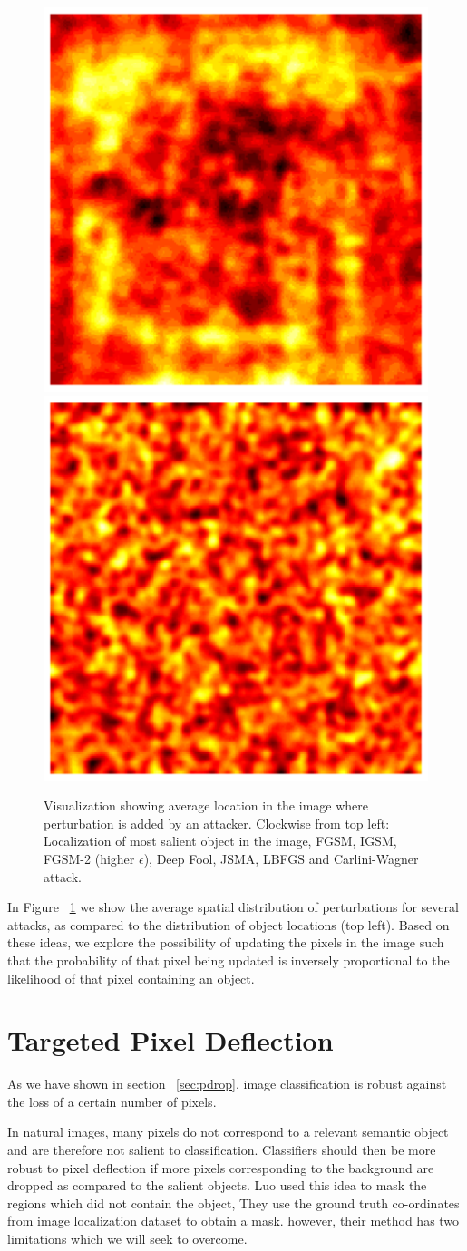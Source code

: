 \begin{figure}[H]
   \includegraphics[width=0.242\linewidth]{figures/pixel/vis_attack_5.pdf}
   \includegraphics[width=0.242\linewidth]{figures/pixel/vis_attack_9.pdf}
   
   \caption[Location of perturbation]{Visualization showing average location in the image where perturbation is added by an attacker.
   Clockwise from top left:
   Localization of most salient object in the image, FGSM, IGSM, FGSM-2 (higher $\epsilon$), Deep Fool, JSMA, LBFGS and Carlini-Wagner attack.
   \label{fig:visattack}}
   
\end{figure}

In Figure ~\ref{fig:visattack} we show the average spatial distribution of perturbations for several attacks, as compared to the distribution of object locations (top left). 
Based on these ideas, we explore the possibility of updating the pixels in the image such that the probability of that pixel being updated is inversely proportional to the likelihood of that pixel containing an object.


\section{Targeted Pixel Deflection \label{sec:tpd}}

As we have shown in section ~\ref{sec:pdrop}, image classification is robust against the loss of a certain number of pixels. 

In natural images, many pixels do not correspond to a relevant semantic object and are therefore not salient to classification.
Classifiers should then be more robust to pixel deflection if more pixels corresponding to the background are dropped as compared to the salient objects.
Luo \etal \cite{FoveationbasedMALuo2015} used this idea to mask the regions which did not contain the object,
They use the ground truth co-ordinates from image localization dataset to obtain a mask.
however, their method has two limitations which we will seek to overcome.

